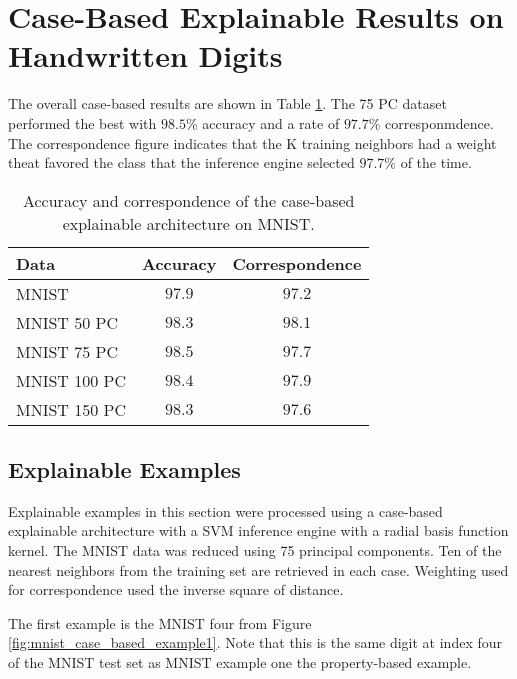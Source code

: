 \section{Case-Based Explainable Results on Handwritten Digits}
\label{sec:case_based_handwriting_results}

The overall case-based results are shown in Table
\ref{tab:mnist_case_based_results}. The 75 PC dataset performed the best with
$98.5\%$ accuracy and a rate of $97.7\%$ corresponmdence. The correspondence
figure indicates that the K training neighbors had a weight theat favored
the class that the inference engine selected $97.7\%$ of the time.


\begin{table}[H]
    \renewcommand{\arraystretch}{1.3}
    \centering
    \caption{Accuracy and correspondence of the case-based explainable architecture on MNIST.}
    \begin{tabular}{|l|c|c|}
        \hline
        Data & Accuracy & Correspondence \\
        \hline
        \hline
        MNIST & $97.9$ & $97.2$ \\
        \hline
        MNIST 50 PC & $98.3$ & $98.1$ \\
        \hline
        MNIST 75 PC & $98.5$ & $97.7$  \\
        \hline
        MNIST 100 PC & $98.4$ & $97.9$  \\
        \hline
        MNIST 150 PC & $98.3$ & $97.6$  \\
        \hline
    \end{tabular}
    \label{tab:mnist_case_based_results}
\end{table}

\subsection{Explainable Examples}
\label{sec:case_based_explainable_examples}

Explainable examples in this section were processed using a case-based
explainable architecture with a SVM inference engine with a radial basis function
kernel.  The MNIST data was reduced using 75 principal components.  Ten of the
nearest neighbors from the training set are retrieved in each case. Weighting
used for correspondence used the inverse square of distance.


The first example is the MNIST four from Figure \ref{fig:mnist_case_based_example1}.
Note that this is the same digit at index four of the MNIST test set as MNIST example one
the property-based example.


